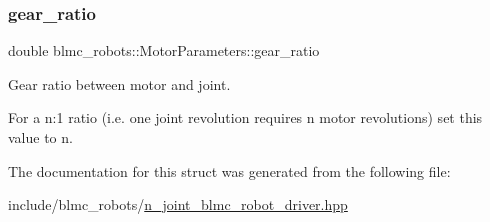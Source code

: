 \subsubsection{\texorpdfstring{gear\+\_\+ratio}{gear\_ratio}}
{\footnotesize\ttfamily double blmc\+\_\+robots\+::\+Motor\+Parameters\+::gear\+\_\+ratio}



Gear ratio between motor and joint. 

For a {\ttfamily n\+:1} ratio (i.\+e. one joint revolution requires n motor revolutions) set this value to {\ttfamily n}. 

The documentation for this struct was generated from the following file\+:\begin{DoxyCompactItemize}
\item 
include/blmc\+\_\+robots/\hyperlink{n__joint__blmc__robot__driver_8hpp}{n\+\_\+joint\+\_\+blmc\+\_\+robot\+\_\+driver.\+hpp}\end{DoxyCompactItemize}
